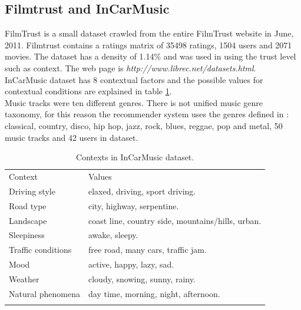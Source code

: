
\subsection{Filmtrust and InCarMusic} 

FilmTrust is a small dataset crawled from the entire FilmTrust website
in June, 2011. Filmtrust contains a ratings matrix of 35498 ratings,
1504  users and 2071 movies. The dataset has a density of 1.14\% and
was used in \cite{guo2013novel} using the trust level such as
context. The web page is \textit{http://www.librec.net/datasets.html}.\\ 
InCarMusic dataset\cite{baltrunas2011incarmusic} has 8 
contextual factors and the possible values for contextual conditions 
are explained in table \ref{tab:incarmusic}.\\ 
Music tracks were ten different genres. There is not unified music
genre taxonomy, for this reason the recommender system uses the genres
defined in \cite{tzanetakis2002musical}: classical, country, disco, 
hip hop, jazz, rock, blues, reggae, pop and metal, 50 music tracks 
and 42 users in dataset.
\begin{table}
\centering
\small
\captionsetup{font=footnotesize}
\caption{Contexts in InCarMusic dataset.}
\label{tab:incarmusic}   
\begin{tabular}{ll}
\hline\noalign{\smallskip}
Context  			& Values \\
\noalign{\smallskip}\hline\noalign{\smallskip}
Driving style 		&  elaxed, driving, sport driving.   \\
Road type 			&  city, highway, serpentine. \\
Landscape 			& coast line, country side, mountains/hills, urban.\\
Sleepiness 			& awake, sleepy. \\
Traffic conditions 	& free road, many cars, traffic jam. \\
Mood 				& active, happy, lazy, sad. \\
Weather 			& cloudy, snowing, sunny, rainy. \\
Natural phenomena 	& day time, morning, night, afternoon. \\
\noalign{\smallskip}\hline
\end{tabular}
\end{table}

